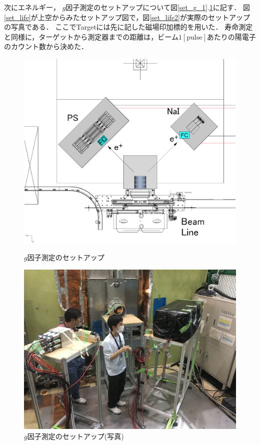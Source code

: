 次にエネルギー， $g$因子測定のセットアップについて図\ref{set_g_1}.\ref{set_g_2}に記す．
図\ref{set_life}が上空からみたセットアップ図で，図\ref{set_life2}が実際のセットアップの写真である．
ここでTargetには先に記した磁場印加標的を用いた．
寿命測定と同様に，ターゲットから測定器までの距離は，ビーム$1[\mathrm{pulse}]$あたりの陽電子のカウント数から決めた．
\begin{figure}[H]
  \begin{minipage}{0.45\hsize}
    \begin{center}
      \includegraphics[width=1\textwidth]{figure/tajima/g-2_3.png}
      \caption{$g$因子測定のセットアップ}
      \label{set_g_1}
    \end{center}
  \end{minipage}
  \begin{minipage}{0.45\hsize}
    \begin{center}
      \includegraphics[width=1.1\textwidth]{figure/tajima/g.jpg}
      \caption{$g$因子測定のセットアップ(写真)}
      \label{set_g_2}
    \end{center}
  \end{minipage}
\end{figure}
